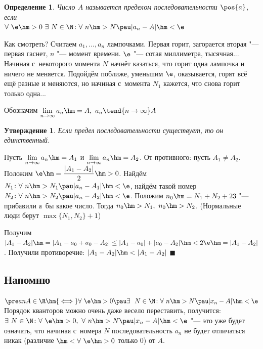 \documentclass[a4paper,10pt,twoside]{article}
\newtheorem{Def}{Определение}[section]
\newtheorem{Ut}{Утверждение}[section]
\newenvironment{Proof}
       {\par\noindent{\textbf{Доказательство.}}}
       {\hfill$\scriptstyle\blacksquare$}
\begin{document}
\begin{Def}
    Число $A$ называется пределом последовательности $\pos{a}$, если \\$\forall\  \e\hm>0\ \exists\  N\in\N\colon \forall\  n\hm>N\pau |a_n-A|\hm<\e$
\end{Def}

Как смотреть? Считаем $a_1,\ldots,a_n$ лампочками. Первая горит, загорается вторая "--- первая гаснет, $n$ "--- момент времени. $\e$ "--- сотая миллиметра, тысячная...
Начиная с~некоторого момента $N$ начнёт казаться, что горит одна лампочка и ничего не меняется.
Подойдём поближе, уменьшим $\e$, оказывается, горят всё ещё разные и меняются, но начиная с~момента $N_1$ кажется, что снова горит только одна...

Обозначим $\lim\limits_{n\to\infty}a_n\hm=A,\ a_n\tend{n\to\infty} A$

\begin{Ut}\label{edin}
    Если предел последовательности существует, то он единственный.
\end{Ut}

\begin{Proof}
     Пусть $\lim\limits_{n\to\infty}a_n\hm=A_1$ и $\lim\limits_{n\to\infty}a_n\hm=A_2$. От противного: пусть $A_1\neq A_2$. \\Положим $\e\hm=\dfrac{|A_1-A_2|}{2}\hm>0$.
     Найдём $N_1\colon \forall\  n\hm>N_1\pau |a_n-A_1|\hm<\e$, найдём такой номер $N_2\colon \forall\  n\hm>N_2 \pau|a_n-A_2|\hm<\e$. Положим $n_0\hm=N_1+N_2+23$ "--- прибавили а~бы какое число.
     Тогда $n_0\hm>N_1,\ n_0\hm>N_2$. (Нормальные люди берут $\max\{N_1,N_2\}+1$)

     Получим $|A_1-A_2|\hm=|A_1-a_0+a_0-A_2|\leq|A_1-a_0|+|a_0-A_2|\hm<2\e\hm=|A_1-A_2|$. Получили противоречие: $|A_1-A_2|\hm<|A_1-A_2|$
\end{Proof}


    \subsection*{Напомню}

    $\pre anA\in\R \hm{\iff} \forall\  \e\hm>0\pau \exists\ \ N\in\N\colon \forall\  n\hm>N\pau |x_n-A|\hm<\e$ Порядок кванторов можно очень даже весело переставить, получится:
    $\exists\  N\in\N\colon \forall\  \e\hm>0,\ \forall\  n\hm>N \pau |x_n-A|\hm<\e$ "--- это уже будет означать, что начиная с~номера $N$ последовательность $a_n$ не будет отличаться никак (различие $\hm<\forall\  \e\hm>0$ только $0$) от $A$.
\end{document}
